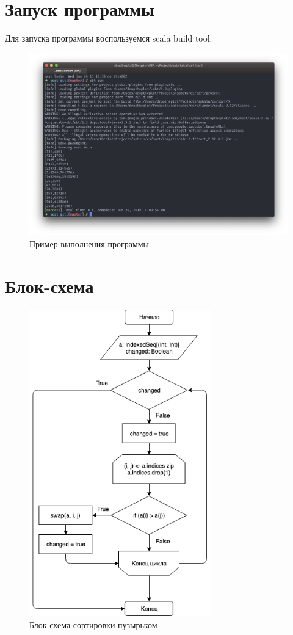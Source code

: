 \documentclass[a4paper,14pt,russian]{report}
\begin{document}
\section{Запуск программы}

Для запуска программы воспользуемся scala build tool.

\begin{figure}[!htb]
\centerline{\includegraphics[width=1.2\textwidth]{example}}
\caption{Пример выполнения программы}
\end{figure}

\section{Блок-схема}

\begin{figure}[!htb]
\centerline{\includegraphics[width=0.7\textwidth]{flowchart}}
\caption{Блок-схема сортировки пузырьком}
\end{figure}
\end{document}
